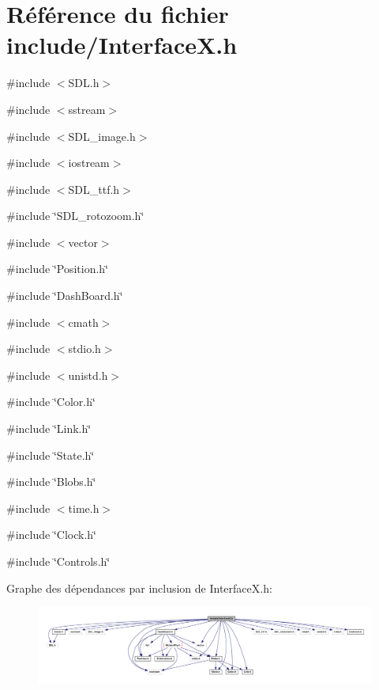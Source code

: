 \hypertarget{a00028}{
\section{Référence du fichier include/InterfaceX.h}
\label{a00028}
}
{\ttfamily \#include $<$SDL.h$>$}\par
{\ttfamily \#include $<$sstream$>$}\par
{\ttfamily \#include $<$SDL\_\-image.h$>$}\par
{\ttfamily \#include $<$iostream$>$}\par
{\ttfamily \#include $<$SDL\_\-ttf.h$>$}\par
{\ttfamily \#include \char`\"{}SDL\_\-rotozoom.h\char`\"{}}\par
{\ttfamily \#include $<$vector$>$}\par
{\ttfamily \#include \char`\"{}Position.h\char`\"{}}\par
{\ttfamily \#include \char`\"{}DashBoard.h\char`\"{}}\par
{\ttfamily \#include $<$cmath$>$}\par
{\ttfamily \#include $<$stdio.h$>$}\par
{\ttfamily \#include $<$unistd.h$>$}\par
{\ttfamily \#include \char`\"{}Color.h\char`\"{}}\par
{\ttfamily \#include \char`\"{}Link.h\char`\"{}}\par
{\ttfamily \#include \char`\"{}State.h\char`\"{}}\par
{\ttfamily \#include \char`\"{}Blobs.h\char`\"{}}\par
{\ttfamily \#include $<$time.h$>$}\par
{\ttfamily \#include \char`\"{}Clock.h\char`\"{}}\par
{\ttfamily \#include \char`\"{}Controls.h\char`\"{}}\par
Graphe des dépendances par inclusion de InterfaceX.h:
\nopagebreak
\begin{figure}[H]
\begin{center}
\leavevmode
\includegraphics[width=400pt]{a00058}
\end{center}
\end{figure}
